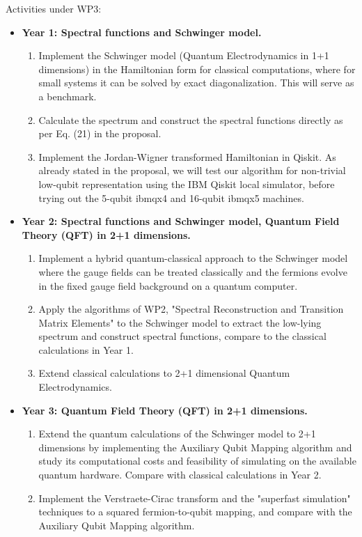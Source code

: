 \documentclass[11pt]{article}
\begin{document}
Activities under WP3:
\begin{itemize}
	\item \textbf{Year 1: Spectral functions and Schwinger model.}
	\begin{enumerate}
	\item Implement the Schwinger model (Quantum Electrodynamics in 1+1 dimensions) in the Hamiltonian form for classical computations,
          where for small systems it can be solved by exact diagonalization. This will serve as a benchmark.
	\item Calculate the spectrum and construct the spectral functions directly as per Eq. (21) in the proposal.
	\item Implement the Jordan-Wigner transformed Hamiltonian in
          Qiskit.
          As already stated in the proposal,
          we will test our algorithm for non-trivial low-qubit
          representation using
          the IBM Qiskit local simulator,
          before trying out the 5-qubit ibmqx4 and 16-qubit ibmqx5 machines.
	\end{enumerate}
      \item \textbf{Year 2: Spectral functions and Schwinger model, Quantum Field Theory (QFT) in 2+1 dimensions.}
	\begin{enumerate}
	\item Implement a hybrid quantum-classical approach to the Schwinger
	  model where the gauge fields can be treated classically and the
	  fermions evolve in the fixed gauge field background on a quantum
	  computer. 
	\item Apply the algorithms of WP2, "Spectral Reconstruction and Transition Matrix Elements"
          to the Schwinger model to extract the low-lying spectrum and construct
          spectral functions, compare to the classical calculations in Year 1.
	\item Extend classical calculations to 2+1 dimensional Quantum Electrodynamics.
	\end{enumerate}
      \item \textbf{Year 3: Quantum Field Theory (QFT) in 2+1 dimensions.}
        \begin{enumerate}
        \item Extend the quantum calculations of the Schwinger model to 2+1 dimensions by implementing the Auxiliary Qubit Mapping algorithm and study its computational costs and feasibility of simulating on the available quantum hardware.
          Compare with classical calculations in Year 2.
        \item Implement the Verstraete-Cirac transform and the "superfast simulation"
          techniques to a squared fermion-to-qubit mapping, and compare with
          the Auxiliary Qubit Mapping algorithm.
	\end{enumerate}
\end{itemize}
\end{document}

